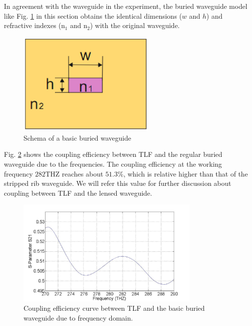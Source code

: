 In agreement with the waveguide in the experiment, the buried waveguide model like Fig. \ref{fig:buried_waveguide} in this section obtains the identical dimensions ($w$ and $h$) and refractive indexes (n$_{1}$ and n$_{2}$) with the original waveguide. 
\begin{figure}[!ht]
\centering
\includegraphics[width=0.6\textwidth]{bilder/buried_waveguide}
\caption{Schema of a basic buried waveguide}
\label{fig:buried_waveguide}
\end{figure}
Fig. \ref{fig:curve_coupling_basic_buried_waveguide} shows the coupling efficiency between TLF and the regular buried waveguide due to the frequencies. The coupling efficiency at the working frequency $282$THZ reaches about $51.3\%$, which is relative higher than that of the stripped rib waveguide. We will refer this value for further discussion about coupling between TLF and the lensed waveguide.  
\begin{figure}[!ht]
\centering
\includegraphics[width=0.8\textwidth]{bilder/s21_sym_waveguide}
\caption{Coupling efficiency curve between TLF and the basic buried waveguide due to frequency domain.}
\label{fig:curve_coupling_basic_buried_waveguide}
\end{figure}
